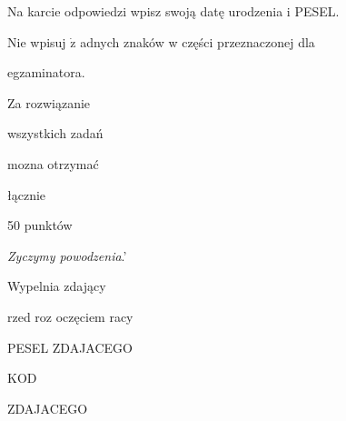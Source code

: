 \documentclass[a4paper,12pt]{article}
\begin{document}
Na karcie odpowiedzi wpisz swoją datę urodzenia i PESEL.

Nie wpisuj $\dot{\mathrm{z}}$ adnych znaków w części przeznaczonej dla

egzaminatora.

Za rozwiązanie

wszystkich zadań

mozna otrzymać

łącznie

50 punktów

{\it Zyczymy powodzenia}.'

Wypelnia zdający

rzed roz oczęciem racy

PESEL ZDAJACEGO

KOD

ZDAJACEGO
\end{document}
